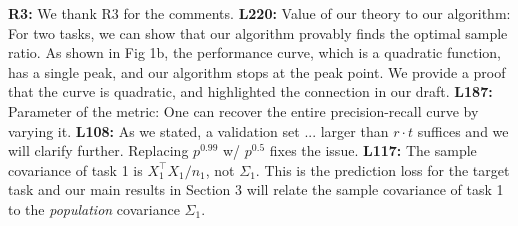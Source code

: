 \documentclass{article}
\begin{document}
\vspace{-0.02in}
\textbf{R3:}
We thank R3 for the comments.
\textbf{L220:} Value of our theory to our algorithm:
For two tasks, we can show that our algorithm provably finds the optimal sample ratio. As shown in Fig 1b, the performance curve, which is a quadratic function, has a single peak, and our algorithm stops at the peak point.
We provide a proof that the curve is quadratic, and highlighted the connection in our draft.
\textbf{L187:} Parameter of the metric: One can recover the entire precision-recall curve by varying it.
\textbf{L108:}
As we stated, a validation set ... larger than $r\cdot t$ suffices and
we will clarify further. Replacing $p^{0.99}$ w/ $p^{0.5}$ fixes the issue.
\textbf{L117:} The sample covariance of task 1 is  $X_1^{\top}X_1 / n_1$, not $\Sigma_1$.
This is the prediction loss for the target task and our main results in Section 3 will relate the sample covariance of task 1 to the \textit{population} covariance $\Sigma_1$.
\end{document}
